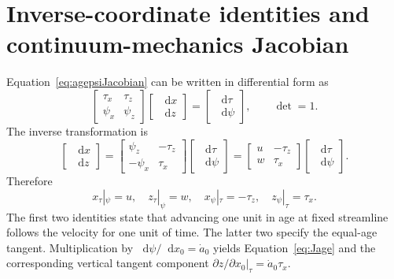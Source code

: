 \documentclass[review]{igs}
\providecommand{\DIFadd}[1]{{\protect\color{blue} \sf #1}} %
\providecommand{\DIFdel}[1]{{\protect\color{red} \scriptsize #1}} %
\providecommand{\DIFaddbegin}{} %
\providecommand{\DIFaddend}{} %
\providecommand{\DIFdelbegin}{} %
\providecommand{\DIFdelend}{} %
\newcommand{\DIFscaledelfig}{0.5}
\newlength{\DIFdelgraphicswidth} %
\newlength{\DIFdelgraphicsheight} %
\newcommand{\DIFaddincludegraphics}[2][]{{\color{blue}\fbox{\DIFOincludegraphics[#1]{#2}}}} %
\newcommand{\DIFdelincludegraphics}[2][]{%
\sbox{\DIFdelgraphicsbox}{\DIFOincludegraphics[#1]{#2}}%
\settoboxwidth{\DIFdelgraphicswidth}{\DIFdelgraphicsbox} %
\settoboxtotalheight{\DIFdelgraphicsheight}{\DIFdelgraphicsbox} %
\scalebox{\DIFscaledelfig}{%
\parbox[b]{\DIFdelgraphicswidth}{\usebox{\DIFdelgraphicsbox}\\[-\baselineskip] \rule{\DIFdelgraphicswidth}{0em}}\llap{\resizebox{\DIFdelgraphicswidth}{\DIFdelgraphicsheight}{%
\setlength{\unitlength}{\DIFdelgraphicswidth}%
\begin{picture}(1,1)%
\thicklines\linethickness{2pt} %
{\color[rgb]{1,0,0}\put(0,0){\framebox(1,1){}}}%
{\color[rgb]{1,0,0}\put(0,0){\line( 1,1){1}}}%
{\color[rgb]{1,0,0}\put(0,1){\line(1,-1){1}}}%
\end{picture}%
}\hspace*{3pt}}} %
} %
\DeclareRobustCommand{\DIFaddbegin}{\DIFOaddbegin \let\includegraphics\DIFaddincludegraphics} %
\DeclareRobustCommand{\DIFaddend}{\DIFOaddend \let\includegraphics\DIFOincludegraphics} %
\DeclareRobustCommand{\DIFdelbegin}{\DIFOdelbegin \let\includegraphics\DIFdelincludegraphics} %
\DeclareRobustCommand{\DIFdelend}{\DIFOaddend \let\includegraphics\DIFOincludegraphics} %
\begin{document}
\section{Inverse-coordinate identities and continuum-mechanics Jacobian}
\label{app:inverse}

\DIFadd{Equation~}\DIFaddend \ref{eq:agepsiJacobian} can be written \DIFaddbegin \DIFadd{in differential form as
}\DIFaddend \begin{equation}
\begin{bmatrix}
\tau_x & \tau_z\\
\psi_x & \psi_z
\end{bmatrix}
\begin{bmatrix}
\mathop{}\!\mathrm{d} x\\
\mathop{}\!\mathrm{d} z
\end{bmatrix}
=
\begin{bmatrix}
\mathop{}\!\mathrm{d}\tau\\
\mathop{}\!\mathrm{d}\psi
\end{bmatrix},
\qquad
\det=1.
\end{equation}
The inverse transformation is
\begin{equation}
\begin{bmatrix}
\mathop{}\!\mathrm{d} x\\
\mathop{}\!\mathrm{d} z
\end{bmatrix}
=
\begin{bmatrix}
\psi_z & -\tau_z\\
-\psi_x & \tau_x
\end{bmatrix}
\begin{bmatrix}
\mathop{}\!\mathrm{d}\tau\\
\mathop{}\!\mathrm{d}\psi
\end{bmatrix}
=
\begin{bmatrix}
 u & -\tau_z\\
 w & \tau_x
\end{bmatrix}
\begin{bmatrix}
\mathop{}\!\mathrm{d}\tau\\
\mathop{}\!\mathrm{d}\psi
\end{bmatrix}.
\label{eq:inversemap}
\end{equation}
Therefore
\begin{equation}
 x_{\tau}|_{\psi}=u,
 \quad
 z_{\tau}|_{\psi}=w,
 \quad
 x_{\psi}|_{\tau}=-\tau_z,
 \quad
 z_{\psi}|_{\tau}=\tau_x.
\end{equation}
The first two identities state that advancing one unit in age at fixed streamline follows the velocity for one unit of time. The latter two specify the equal-age tangent. Multiplication by \(\mathop{}\!\mathrm{d}\psi/\mathop{}\!\mathrm{d} x_0=\dot a_0\) yields Equation~\ref{eq:Jage} and \DIFdelbegin \DIFdel{the corresponding vertical tangent component}\DIFdelend \DIFaddbegin \DIFadd{\(\left.\partial z/\partial x_0\right|_{\tau}=\dot a_0\tau_x\)}\DIFaddend .
\end{document}
